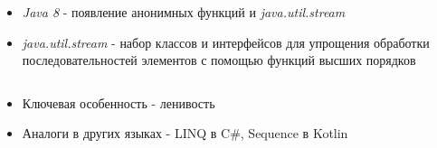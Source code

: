 \begin{frame}
\frametitle{\insertsection} 
\framesubtitle{\insertsubsection}
\begin{itemize}
	\item \textit{Java 8} - появление анонимных функций и \textit{java.util.stream}
	\item \textit{java.util.stream} - набор классов и интерфейсов для упрощения обработки последовательностей элементов с помощью функций высших порядков
	\inputminted{java}{code/StreamsExample.java}
	\item Ключевая особенность - ленивость
	\item Аналоги в других языках - LINQ в C\#, Sequence в Kotlin
\end{itemize}
\end{frame}